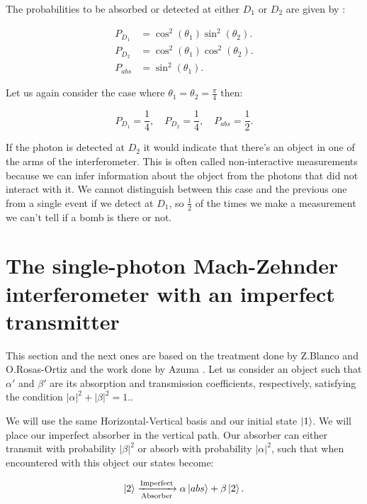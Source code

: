 \documentclass{book}
\begin{document}
The probabilities to be absorbed or detected at either $D_{1}$ or $D_{2}$ are given by :

\begin{align}
P_{D_{1}}&=\cos^2(\theta_{1}) \sin^2(\theta_{2}) .\\
P_{D_{2}}&=\cos^2(\theta_{1}) \cos^2(\theta_{2}).\\
P_{abs}&=\sin^2(\theta_{1}).
\end{align}

Let us again consider the case where $\theta_{1}=\theta_{2}=\frac{\pi}{4}$ then:

\begin{equation}
P_{D_{1}}=\frac{1}{4},\quad P_{D_{2}}=\frac{1}{4}, \quad P_{abs}=\frac{1}{2}.
\end{equation}

If the photon is detected at $D_{2}$ it would indicate that there's an object in one of the arms of the interferometer. This is often called non-interactive measurements because we can infer information about the object from the photons that did not interact with it. We cannot distinguish between this case and the previous one from a single event if we detect at $D_{1}$, so $\frac{1}{2}$ of the times we make a measurement we can't tell if a bomb is there or not.



\section{The single-photon Mach-Zehnder interferometer with an  imperfect transmitter}

This section and the next ones are based on the treatment done by Z.Blanco and O.Rosas-Ortiz \cite{zuri} \cite{azuri} and the work done by Azuma \cite{Azuma}. Let us consider an object such that $\alpha'$ and $\beta'$ are its absorption and transmission coefficients, respectively, satisfying the condition $|\alpha|^2 + |\beta|^2 = 1.$.

We will use the same Horizontal-Vertical basis and our initial state $\ket{1}$. We will place our imperfect absorber in the vertical path. Our absorber can either transmit with probability $|\beta|^2$ or absorb with probability $|\alpha|^2$, such that when encountered with this object our states become:


\begin{align}
\ket{2}\xrightarrow[\text{Absorber}]{\text{Imperfect}}\alpha \ket{abs} +\beta \ket{2}.
\end{align}
\end{document}
